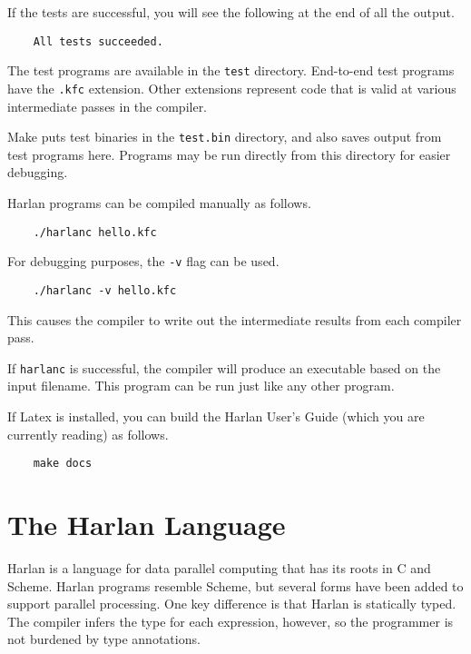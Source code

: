 \documentclass{book}
\begin{document}
If the tests are successful, you will see the following at the end of
all the output.

\begin{verbatim}
    All tests succeeded.
\end{verbatim}

The test programs are available in the \texttt{test}
directory. End-to-end test programs have the \texttt{.kfc}
extension. Other extensions represent code that is valid at various
intermediate passes in the compiler.

Make puts test binaries in the \texttt{test.bin} directory, and also
saves output from test programs here. Programs may be run directly
from this directory for easier debugging.

Harlan programs can be compiled manually as follows.

\begin{verbatim}
    ./harlanc hello.kfc
\end{verbatim}

For debugging purposes, the \texttt{-v} flag can be used.

\begin{verbatim}
    ./harlanc -v hello.kfc
\end{verbatim}

This causes the compiler to write out the intermediate results from
each compiler pass.

If \texttt{harlanc} is successful, the compiler will produce an
executable based on the input filename. This program can be run just
like any other program.

If Latex is installed, you can build the Harlan User's Guide (which
you are currently reading) as follows.

\begin{verbatim}
    make docs
\end{verbatim}



\chapter{The Harlan Language}

Harlan is a language for data parallel computing that has its roots in
C and Scheme. Harlan programs resemble Scheme, but several forms have
been added to support parallel processing. One key difference is that
Harlan is statically typed. The compiler infers the type for each
expression, however, so the programmer is not burdened by type
annotations.
\end{document}
